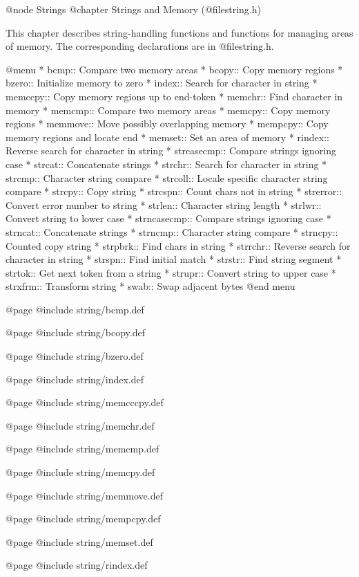@node Strings
@chapter Strings and Memory (@file{string.h})

This chapter describes string-handling functions and functions for
managing areas of memory.  The corresponding declarations are in
@file{string.h}.

@menu
* bcmp::        Compare two memory areas
* bcopy::       Copy memory regions
* bzero::       Initialize memory to zero
* index::       Search for character in string
* memccpy::     Copy memory regions up to end-token
* memchr::      Find character in memory
* memcmp::      Compare two memory areas
* memcpy::      Copy memory regions
* memmove::     Move possibly overlapping memory
* mempcpy::	Copy memory regions and locate end
* memset::      Set an area of memory
* rindex::      Reverse search for character in string
* strcasecmp::	Compare strings ignoring case
* strcat::      Concatenate strings
* strchr::      Search for character in string
* strcmp::      Character string compare
* strcoll::     Locale specific character string compare
* strcpy::      Copy string
* strcspn::     Count chars not in string
* strerror::    Convert error number to string
* strlen::      Character string length
* strlwr::	Convert string to lower case
* strncasecmp::	Compare strings ignoring case
* strncat::     Concatenate strings
* strncmp::     Character string compare
* strncpy::     Counted copy string
* strpbrk::     Find chars in string
* strrchr::     Reverse search for character in string
* strspn::      Find initial match
* strstr::      Find string segment
* strtok::      Get next token from a string
* strupr::	Convert string to upper case
* strxfrm::     Transform string
* swab::        Swap adjacent bytes
@end menu

@page
@include string/bcmp.def

@page
@include string/bcopy.def

@page
@include string/bzero.def

@page
@include string/index.def

@page
@include string/memcccpy.def

@page
@include string/memchr.def

@page
@include string/memcmp.def

@page
@include string/memcpy.def

@page
@include string/memmove.def

@page
@include string/mempcpy.def

@page
@include string/memset.def

@page
@include string/rindex.def

